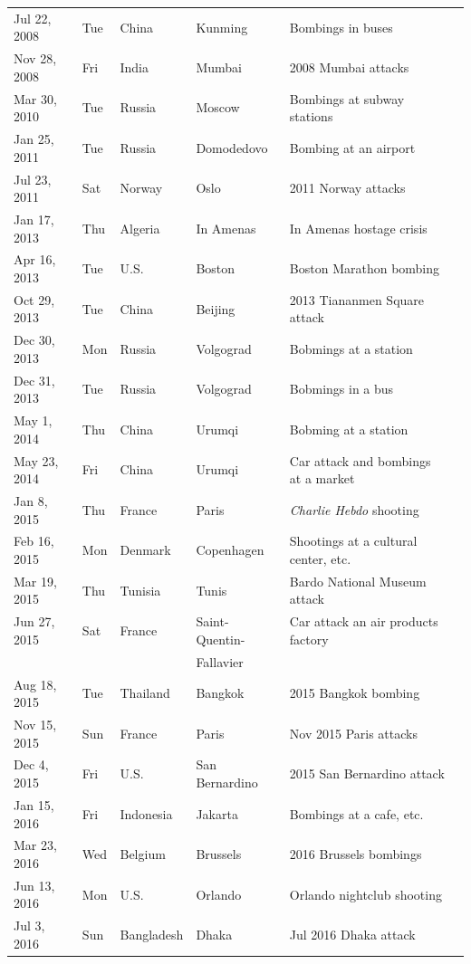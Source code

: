 \documentclass[12pt,letterpaper]{scrartcl}
\begin{document}
\begin{longtable}[c]{lllllr}
Jul 22, 2008 & Tue & China & Kunming & Bombings in buses \\
Nov 28, 2008 & Fri & India & Mumbai & 2008 Mumbai attacks \\
Mar 30, 2010 & Tue & Russia & Moscow & Bombings at subway stations \\
Jan 25, 2011 & Tue & Russia & Domodedovo & Bombing at an airport \\
Jul 23, 2011 & Sat & Norway & Oslo & 2011 Norway attacks \\
Jan 17, 2013 & Thu & Algeria & In Amenas & In Amenas hostage crisis \\
Apr 16, 2013 & Tue & U.S. & Boston & Boston Marathon bombing \\
Oct 29, 2013 & Tue & China & Beijing & 2013 Tiananmen Square attack \\
Dec 30, 2013 & Mon & Russia & Volgograd & Bobmings at a station \\
Dec 31, 2013 & Tue & Russia & Volgograd & Bobmings in a bus \\
May 1, 2014 & Thu & China & Urumqi & Bobming at a station \\
May 23, 2014 & Fri & China & Urumqi & Car attack and bombings at a market \\
Jan 8, 2015 & Thu & France & Paris & \emph{Charlie Hebdo} shooting \\
Feb 16, 2015 & Mon & Denmark & Copenhagen & Shootings at a cultural center, etc. \\
Mar 19, 2015 & Thu & Tunisia & Tunis & Bardo National Museum attack \\
Jun 27, 2015 & Sat & France & Saint-Quentin- & Car attack an air products factory \\
 & & & \hspace{0.5em}Fallavier & \\
Aug 18, 2015 & Tue & Thailand & Bangkok & 2015 Bangkok bombing \\
Nov 15, 2015 & Sun & France & Paris & Nov 2015 Paris attacks \\
Dec 4, 2015 & Fri & U.S. & San Bernardino & 2015 San Bernardino attack \\
Jan 15, 2016 & Fri & Indonesia & Jakarta & Bombings at a cafe, etc. \\
Mar 23, 2016 & Wed & Belgium & Brussels & 2016 Brussels bombings \\
Jun 13, 2016 & Mon & U.S. & Orlando & Orlando nightclub shooting \\
Jul 3, 2016 & Sun & Bangladesh & Dhaka & Jul 2016 Dhaka attack \\

\end{longtable}
\end{document}
